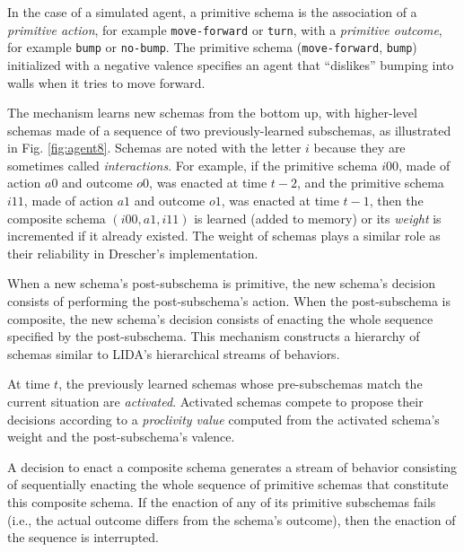 \documentclass[runningheads]{llncs}
\begin{document}
In the case of a simulated agent, a primitive schema is the association of a \textit{primitive action}, for example \texttt{move-forward} or \texttt{turn}, with a \textit{primitive outcome}, for example \texttt{bump} or \texttt{no-bump}.  
The primitive schema (\texttt{move-forward}, \texttt{bump}) initialized with a negative valence specifies an agent that ``dislikes'' bumping into walls when it tries to move forward. 

The mechanism learns new schemas from the bottom up, with higher-level schemas made of a sequence of two previously-learned subschemas, 
as illustrated in Fig. \ref{fig:agent8}. 
Schemas are noted with the letter $i$ because they are sometimes called \textit{interactions}.
For example, if the primitive schema $i00$, made of action $a0$ and outcome $o0$, was enacted at time $t-2$, and the primitive schema $i11$, made of action $a1$ and outcome $o1$,  was enacted at time $t-1$, then the composite schema $(i00, a1, i11)$ is learned (added to memory) or its \textit{weight} is incremented if it already existed. 
The weight of schemas plays a similar role as their reliability in Drescher's implementation.

When a new schema's post-subschema is primitive, the new schema's decision consists of performing the post-subschema's action.
When the post-subschema is composite, the new schema's decision consists of enacting the whole sequence specified by the post-subschema. 
This mechanism constructs a hierarchy of schemas similar to LIDA's hierarchical streams of behaviors. 

At time $t$, the previously learned schemas whose pre-subschemas match the current situation are \textit{activated}.
Activated schemas compete to propose their decisions according to a \textit{proclivity value} computed from the activated schema's weight and the post-subschema's valence. 

A decision to enact a composite schema generates a stream of behavior consisting of sequentially enacting the whole sequence of primitive schemas that constitute this composite schema.  
If the enaction of any of its primitive subschemas fails (i.e., the actual outcome differs from the schema's outcome), then the enaction of the sequence is interrupted. 

\end{document}
